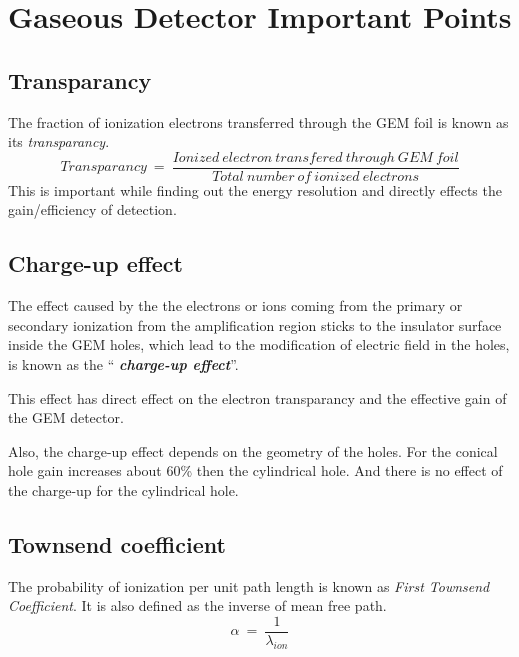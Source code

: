 \chapter{Gaseous Detector Important Points} %
\label{cha:gaseous_detector_important_points}

\section{Transparancy} %
\label{sec:transparancy}
The fraction of ionization electrons transferred through the GEM foil is known as its \textit{transparancy}. 
\begin{equation}
	Transparancy~=~\frac{Ionized~electron~transfered~through~GEM~foil}{Total~number~of~ionized~electrons}
\end{equation}
This is important while finding out the energy resolution and directly effects the gain/efficiency of detection.

\section{Charge-up effect} %
\label{sec:charge_up_effect}

The effect caused by the the electrons or ions coming from the primary or secondary ionization from the amplification region sticks to the insulator surface inside the GEM holes, which lead to the modification of electric field in the holes, is known as the ``\textit{ \textbf{charge-up effect}}''.

This effect has direct effect on the electron transparancy and the effective gain of the GEM detector.

Also, the charge-up effect depends on the geometry of the holes. For the conical hole gain increases about 60\% then the cylindrical hole. And there is no effect of the charge-up for the cylindrical hole.



\section{Townsend coefficient} %
\label{sec:townsend_coefficient}
The probability of ionization per unit path length is known as \textit{First Townsend Coefficient}. It is also defined as the inverse of mean free path.
\begin{equation}
	\alpha~=~\frac{1}{\lambda_{ion}}
\end{equation}

